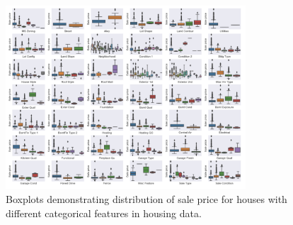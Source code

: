 \documentclass[letterpaper,12pt,twoside,]{pinp}
\begin{document}
\begin{figure}
\includegraphics[width=0.8\textwidth]{boxplot.png}
\centering
\caption{Boxplots demonstrating distribution of sale price for houses with different categorical features in housing data.}
\label{fig:boxplots}
\end{figure}





\end{document}
